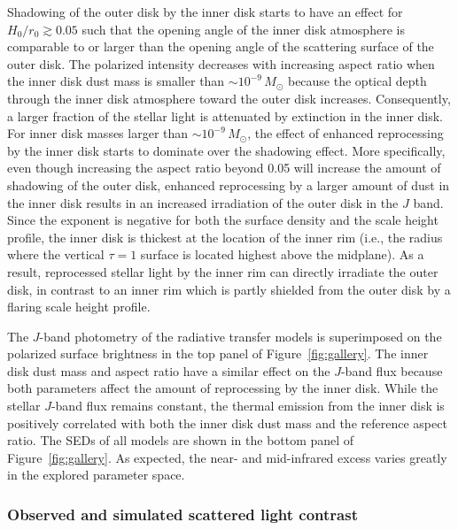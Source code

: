 \documentclass[twocolumn,tighten]{aastex61}
\begin{document}
Shadowing of the outer disk by the inner disk starts to have an effect for $H_0/r_0\gtrsim0.05$ such that the opening angle of the inner disk atmosphere is comparable to or larger than the opening angle of the scattering surface of the outer disk. The polarized intensity decreases with increasing aspect ratio when the inner disk dust mass is smaller than $\sim$$10^{-9}$\,$M_\odot$ because the optical depth through the inner disk atmosphere toward the outer disk increases. Consequently, a larger fraction of the stellar light is attenuated by extinction in the inner disk. For inner disk masses larger than $\sim$$10^{-9}$\,$M_\odot$, the effect of enhanced reprocessing by the inner disk starts to dominate over the shadowing effect. More specifically, even though increasing the aspect ratio beyond 0.05 will increase the amount of shadowing of the outer disk, enhanced reprocessing by a larger amount of dust in the inner disk results in an increased irradiation of the outer disk in the $J$ band. Since the exponent is negative for both the surface density and the scale height profile, the inner disk is thickest at the location of the inner rim (i.e., the radius where the vertical $\tau=1$ surface is located highest above the midplane). As a result, reprocessed stellar light by the inner rim can directly irradiate the outer disk, in contrast to an inner rim which is partly shielded from the outer disk by a flaring scale height profile.

The $J$-band photometry of the radiative transfer models is superimposed on the polarized surface brightness in the top panel of Figure~\ref{fig:gallery}. The inner disk dust mass and aspect ratio have a similar effect on the $J$-band flux because both parameters affect the amount of reprocessing by the inner disk. While the stellar $J$-band flux remains constant, the thermal emission from the inner disk is positively correlated with both the inner disk dust mass and the reference aspect ratio. The SEDs of all models are shown in the bottom panel of Figure~\ref{fig:gallery}. As expected, the near- and mid-infrared excess varies greatly in the explored parameter space.

\subsubsection{Observed and simulated scattered light contrast}\label{sec:contrast}
\end{document}
